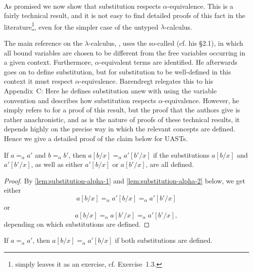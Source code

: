 \documentclass[a4paper, 11pt, article, danish, oneside]{memoir}
\newcommand{\newpar}{\paragraph{}}
\begin{document}
\newpar

As promised we now show that substitution respects $\alpha$-equivalence. This is a fairly technical result, and it is not easy to find detailed proofs of this fact in the literature\footnote{\Textcite{harper-pl} simply leaves it as an exercise, cf. Exercise~1.3.}, even for the simpler case of the untyped $\lambda$-calculus.

The main reference on the $\lambda$-calculus, \textcite{barendregt-lambda}, uses the so-called  (cf. his §2.1), in which all bound variables are chosen to be different from the free variables occurring in a given context. Furthermore, $\alpha$-equivalent terms are identified. He afterwards goes on to define substitution, but for substitution to be well-defined in this context it must respect $\alpha$-equivalence. Barendregt relegates this to his Appendix~C: Here he defines substitution anew with using the variable convention and describes how substitution respects $\alpha$-equivalence. However, he simply refers to \textcite[§3.E]{curry-combinatory} for a proof of this result, but the proof that the authors give is rather anachronistic, and as is the nature of proofs of these technical results, it depends highly on the precise way in which the relevant concepts are defined. Hence we give a detailed proof of the claim below for UASTs.

\begin{proposition}
    \label{prop:substitution-alpha-respects}
    If $a =_\alpha a'$ and $b =_\alpha b'$, then $a[b/x] =_\alpha a'[b'/x]$ if the substitutions $a[b/x]$ and $a'[b'/x]$, as well as either $a'[b/x]$ or $a[b'/x]$, are all defined.
\end{proposition}

\begin{proof}
    By \cref{lem:substitution-alpha-1} and \cref{lem:substitution-alpha-2} below, we get either
    \begin{equation*}
        a[b/x]
            =_\alpha a'[b/x]
            =_\alpha a'[b'/x]
    \end{equation*}
    or
    \begin{equation*}
        a[b/x]
            =_\alpha a[b'/x]
            =_\alpha a'[b'/x],
    \end{equation*}
    depending on which substitutions are defined.
\end{proof}


\begin{lemma}
    \label{lem:substitution-alpha-1}
    If $a =_\alpha a'$, then $a[b/x] =_\alpha a'[b/x]$ if both substitutions are defined.
\end{lemma}
\end{document}
